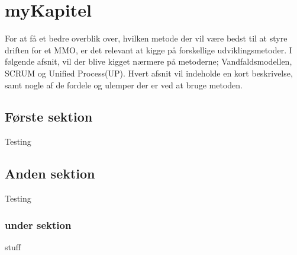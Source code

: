 \cfoot{\page\textbackslash \totalp} %
\chapter{myKapitel}
For at få et bedre overblik over, hvilken metode der vil være bedst til at styre driften for et MMO, er det relevant at kigge på forskellige udviklingsmetoder. I følgende afsnit, vil der blive kigget nærmere på metoderne; Vandfaldsmodellen, SCRUM og Unified Process(UP). Hvert afsnit vil indeholde en kort beskrivelse, samt nogle af de fordele og ulemper der er ved at bruge metoden.\\
\section{Første sektion}
Testing
\section{Anden sektion}
Testing

\subsection{under sektion}

\cite{HTL}stuff
